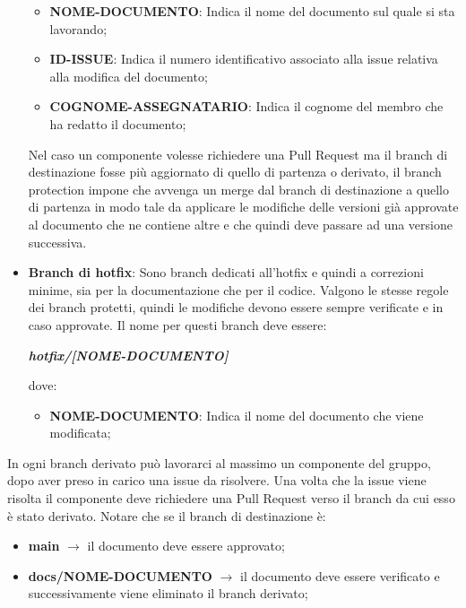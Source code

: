 \begin{itemize}
            \begin{itemize}
                \item \textbf{NOME-DOCUMENTO}: Indica il nome del documento sul quale si sta lavorando;
                \item \textbf{ID-ISSUE}: Indica il numero identificativo associato alla issue relativa alla modifica del documento;
                \item \textbf{COGNOME-ASSEGNATARIO}: Indica il cognome del membro che ha redatto il documento;
            \end{itemize}
            Nel caso un componente volesse richiedere una Pull Request ma il branch di destinazione fosse più aggiornato di quello di partenza o derivato, il branch protection
            impone che avvenga un merge dal branch di destinazione a quello di partenza in modo tale da applicare le modifiche delle versioni già approvate al documento che ne contiene
            altre e che quindi deve passare ad una versione successiva.
            \item \textbf{Branch di hotfix}: Sono branch dedicati all'hotfix e quindi a correzioni minime, sia per la documentazione che per il codice. Valgono le stesse regole dei
            branch protetti, quindi le modifiche devono essere sempre verificate e in caso approvate.
            Il nome per questi branch deve essere:
            \begin{center}
                \textbf{\textit{hotfix/[NOME-DOCUMENTO]}}
            \end{center}
            dove:

            \begin{itemize}
                \item \textbf{NOME-DOCUMENTO}: Indica il nome del documento che viene modificata;
            \end{itemize}
        \end{itemize}

        In ogni branch derivato può lavorarci al massimo un componente del gruppo, dopo aver preso in carico
        una issue da risolvere. Una volta che la issue viene risolta il componente deve richiedere una Pull Request
        verso il branch da cui esso è stato derivato.
        Notare che se il branch di destinazione è:
        \begin{itemize}
            \item \textbf{main} $\rightarrow$ il documento deve essere approvato;
            \item \textbf{docs/NOME-DOCUMENTO} $\rightarrow$ il documento deve essere verificato e successivamente viene eliminato il branch derivato;
        \end{itemize}

